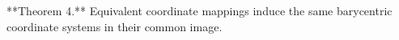 **Theorem 4.** Equivalent coordinate mappings induce the same barycentric coordinate systems in their common image.
